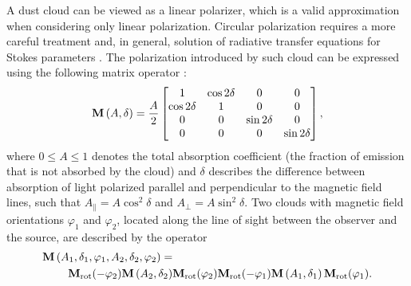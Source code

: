 A dust cloud can be viewed as a linear polarizer, which is a valid approximation when considering only linear polarization.
Circular polarization requires a more careful treatment and, in general, solution of radiative transfer equations for Stokes parameters \citep{Martin1974}.
The polarization introduced by such cloud can be expressed using the following matrix operator \citep{PolarizedLight2}:
\begin{equation}
    \mathbf{M}\left(A, \delta\right) = \frac{A}{2} 
    \begin{bmatrix}
        1 & \cos 2\delta & 0 & 0 \\
        \cos 2\delta & 1 & 0 & 0 \\
        0 & 0 & \sin 2\delta & 0 \\
        0 & 0 & 0 & \sin 2\delta \\        
    \end{bmatrix},
\end{equation}
where $0 \le A \le 1$ denotes the total absorption coefficient (the fraction of emission that is not absorbed by the cloud) and $\delta$ describes the difference between absorption of light polarized parallel and perpendicular to the magnetic field lines, such that $A_\parallel = A\cos^2 \delta$ and $A_\perp = A\sin^2 \delta$.
Two clouds with magnetic field orientations $\varphi_1$ and $\varphi_2$, located along the line of sight between the observer and the source, are described by the operator
\begin{equation}
    \begin{aligned}
        \mathbf{M}\left(A_1, \delta_1, \varphi_1, A_2, \delta_2, \varphi_2\right) = &\\ 
        \mathbf{M}_{\mathrm{rot}}(-\varphi_2) \mathbf{M}\left(A_2, \delta_2\right) & \mathbf{M}_{\mathrm{rot}}(\varphi_2) 
        \mathbf{M}_{\mathrm{rot}}(-\varphi_1) \mathbf{M}\left(A_1, \delta_1\right)  \mathbf{M}_{\mathrm{rot}}(\varphi_1).
    \end{aligned}
\end{equation}

